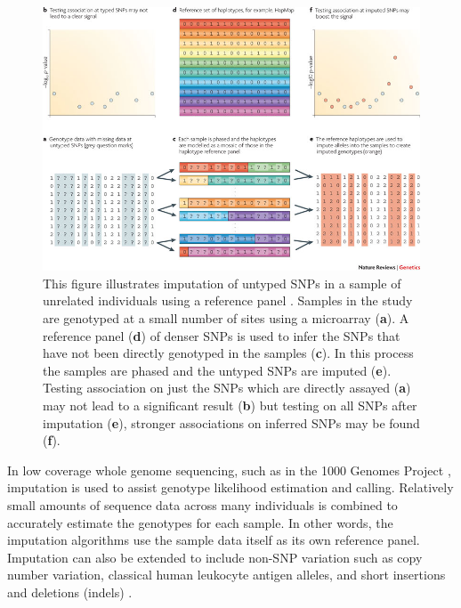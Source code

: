 \documentclass[a4paper,11pt,twoside,abstraction,titlepage]{article}
\begin{document}
\begin{figure}[tp]
\begin{center}
\centerline{\includegraphics[scale=0.58]{reviewimage}}
\vspace{20pt}
\caption{This figure illustrates imputation of untyped SNPs in a sample of unrelated individuals using a reference panel \cite{review2010}.
\newline
Samples in the study are genotyped at a small number of sites using a microarray ({\bf a}). A reference panel ({\bf d}) of denser SNPs is used to infer the SNPs that have not been directly genotyped in the samples ({\bf c}).  In this process the samples are phased and the untyped SNPs are imputed ({\bf e}).
\newline
Testing association on just the SNPs which are directly assayed ({\bf a}) may not lead to a significant result ({\bf b}) but testing on all SNPs after imputation ({\bf e}), stronger associations on inferred SNPs may be found ({\bf f}).}
\end{center}
\vspace{-10pt}
\end{figure}

In low coverage whole genome sequencing, such as in the 1000 Genomes Project \cite{1000genomes}, imputation is used to assist genotype likelihood estimation and calling.  Relatively small amounts of sequence data across many individuals is combined to accurately estimate the genotypes for each sample.  In other words, the imputation algorithms use the sample data itself as its own reference panel.  Imputation can also be extended to include non-SNP variation such as copy number variation, classical human leukocyte antigen alleles, and short insertions and deletions (indels) \cite{review2010}.
\end{document}
